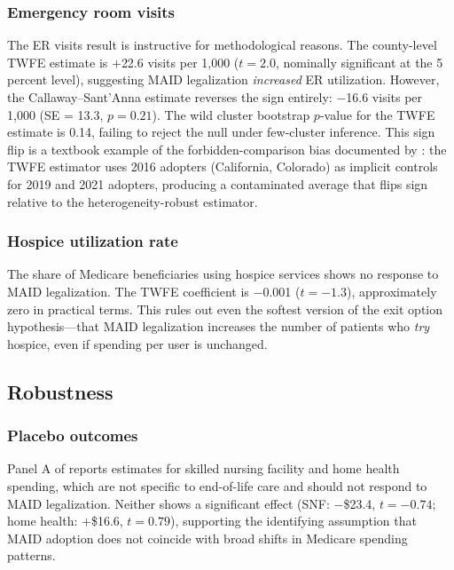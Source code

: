 \documentclass[12pt]{article}
\begin{document}
\subsubsection*{Emergency room visits}
The ER visits result is instructive for methodological reasons. The county-level TWFE estimate is $+$22.6 visits per 1,000 ($t = 2.0$, nominally significant at the 5 percent level), suggesting MAID legalization \textit{increased} ER utilization. However, the Callaway--Sant'Anna estimate reverses the sign entirely: $-$16.6 visits per 1,000 (SE = 13.3, $p = 0.21$). The wild cluster bootstrap $p$-value for the TWFE estimate is 0.14, failing to reject the null under few-cluster inference. This sign flip is a textbook example of the forbidden-comparison bias documented by \citet{goodman2021}: the TWFE estimator uses 2016 adopters (California, Colorado) as implicit controls for 2019 and 2021 adopters, producing a contaminated average that flips sign relative to the heterogeneity-robust estimator.

\subsubsection*{Hospice utilization rate}
The share of Medicare beneficiaries using hospice services shows no response to MAID legalization. The TWFE coefficient is $-$0.001 ($t = -1.3$), approximately zero in practical terms. This rules out even the softest version of the exit option hypothesis---that MAID legalization increases the number of patients who \textit{try} hospice, even if spending per user is unchanged.

\subsection{Robustness}



\subsubsection*{Placebo outcomes}
Panel A of  reports estimates for skilled nursing facility and home health spending, which are not specific to end-of-life care and should not respond to MAID legalization. Neither shows a significant effect (SNF: $-$\$23.4, $t = -0.74$; home health: $+$\$16.6, $t = 0.79$), supporting the identifying assumption that MAID adoption does not coincide with broad shifts in Medicare spending patterns.
\end{document}
